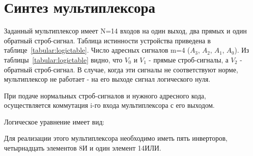 \documentclass[document.tex]{subfiles}
\begin{document}
\section{Синтез мультиплексора}
Заданный мультиплексор имеет N=14 входов на один выход, два прямых и один
обратный строб-сигнал. Таблица истинности устройства приведена в
таблице~\ref{tabular:logictable}. Число адресных сигналов m=4 ($A_{3}$, $A_{2}$,
$A_{1}$, $A_{0}$).
Из таблицы~\ref{tabular:logictable} видно, что $V_{0}$ и $V_{1}$ - прямые
строб-сигналы, а $V_{2}$ - обратный строб-сигнал. В случае, когда эти сигналы не
соответствуют норме, мультиплексор не работает - на его выходе сигнал
логического нуля.

При подаче нормальных строб-сигналов и нужного адресного кода, осуществляется
коммутация i-го входа мультиплексора с его выходом.

Логическое уравнение имеет вид:


Для реализации этого мультиплексора необходимо иметь пять инверторов,
четырнадцать элементов 8И и один элемент 14ИЛИ.


\end{document}

